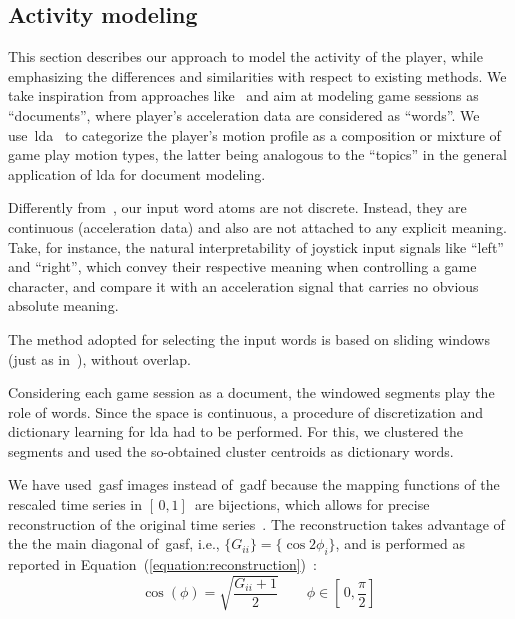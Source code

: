 \subsection{Activity modeling}
This section describes our approach to model the activity of the player, while emphasizing the differences and similarities with respect to existing methods. We take inspiration from approaches like~\cite{smith_mining_2016, wang_encoding_2015, wang_imaging_2015} and aim at modeling game sessions as ``documents'', where player's acceleration data are considered as ``words''. We use~\gls{lda}~\cite{blei_latent_2003} to categorize the player's motion profile as a composition or mixture of game play motion types, the latter being analogous to the ``topics'' in the general application of \gls{lda} for document modeling.

Differently from~\cite{smith_mining_2016}, our input word atoms are not discrete. Instead, they are continuous (acceleration data) and also are not attached to any explicit meaning. Take, for instance, the natural interpretability of joystick input signals like ``left'' and ``right'', which convey their respective meaning when controlling a game character, and compare it with an acceleration signal that carries no obvious absolute meaning.

The method adopted for selecting the input words is based on sliding windows (just as in~\cite{smith_mining_2016}), without overlap. %

Considering each game session as a document, the windowed segments play the role of words. Since the space is continuous, a procedure of discretization and dictionary learning for \gls{lda} had to be performed. For this, we clustered the segments and used the so-obtained cluster centroids as dictionary words.

We have used~\gls{gasf} images instead of~\gls{gadf} because the mapping functions of the rescaled time series in $[\,0,1]\,$ are bijections, which allows for precise reconstruction of the original time series~\cite{wang_imaging_2015}. The reconstruction takes advantage of the the main diagonal of~\gls{gasf}, i.e., $\{G_{ii}\} = \{\cos{2\phi_{i}}\}$, and is performed as reported in Equation~(\ref{equation:reconstruction})~\cite{wang_imaging_2015}: 
\begin{equation}\label{equation:reconstruction}
\cos(\phi)=\sqrt{\frac{G_{ii}+1}{2}} \qquad \phi \in [\,0,\frac{\pi}{2}]\,
\end{equation}

